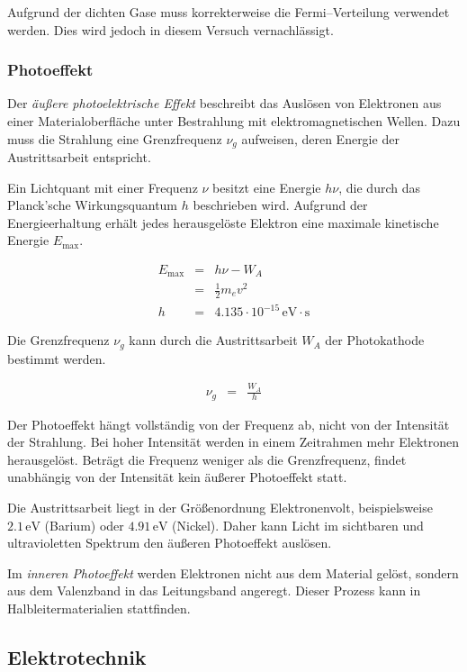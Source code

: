 \documentclass[12pt,a4paper]{scrartcl}
\numberwithin{equation}{section} %
\begin{document}
\noindent
Aufgrund der dichten Gase muss korrekterweise die Fermi--Verteilung verwendet werden. \cite{Gerthsen} Dies wird jedoch in diesem Versuch vernachlässigt.

\subsubsection{Photoeffekt}
Der \emph{äußere photoelektrische Effekt} beschreibt das Auslösen von Elektronen aus einer Materialoberfläche unter Bestrahlung mit elektromagnetischen Wellen. Dazu muss die Strahlung eine Grenzfrequenz $\nu_g$ aufweisen, deren Energie der Austrittsarbeit entspricht.

Ein Lichtquant mit einer Frequenz $\nu$ besitzt eine Energie $h\nu$, die durch das Planck'sche Wirkungsquantum $h$ beschrieben wird. Aufgrund der Energieerhaltung erhält jedes herausgelöste Elektron eine maximale kinetische Energie $E_\mathrm{max}$.

\begin{eqnarray}
	E_\mathrm{max} &=& h\nu - W_A \\
		&=& \frac{1}{2} m_e v^2 \\
	h &=& 4.135 \cdot 10^{-15} \mathrm{\,eV \cdot s}
\end{eqnarray}

\noindent
Die Grenzfrequenz $\nu_g$ kann durch die Austrittsarbeit $W_A$ der Photokathode bestimmt werden.

\begin{eqnarray}
	\nu_g &=& \frac{W_A}{h}
\end{eqnarray}

\noindent
Der Photoeffekt hängt vollständig von der Frequenz ab, nicht von der Intensität der Strahlung. Bei hoher Intensität werden in einem Zeitrahmen mehr Elektronen herausgelöst. Beträgt die Frequenz weniger als die Grenzfrequenz, findet unabhängig von der Intensität kein äußerer Photoeffekt statt.

Die Austrittsarbeit liegt in der Größenordnung Elektronenvolt, beispielsweise $2.1\mathrm{\,eV}$ (Barium) oder $4.91\mathrm{\,eV}$ (Nickel). \cite{Demtröder} Daher kann Licht im sichtbaren und ultravioletten Spektrum den äußeren Photoeffekt auslösen.

Im \emph{inneren Photoeffekt} werden Elektronen nicht aus dem Material gelöst, sondern aus dem Valenzband in das Leitungsband angeregt. Dieser Prozess kann in Halbleitermaterialien stattfinden.

\subsection{Elektrotechnik}
\end{document}
